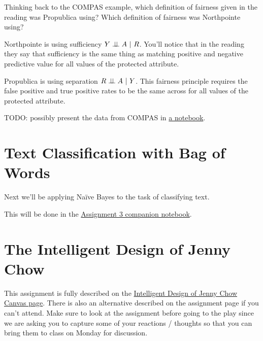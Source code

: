 \documentclass[assignment03_Solutions]{subfiles}
\begin{document}
\begin{exercise}[(5 minutes)]
Thinking back to the COMPAS example, which definition of fairness given in the reading was Propublica using?  Which definition of fairness was Northpointe using?

\begin{boxedsolution}
\bi
\item Northpointe is using sufficiency $Y \perp\!\!\!\perp A~|~R$.  You'll notice that in the reading they say that sufficiency is the same thing as matching positive and negative predictive value for all values of the protected attribute.
\item Propublica is using separation $R \perp\!\!\!\perp A~|~Y$.  This fairness principle requires the false positive and true positive rates to be the same across for all values of the protected attribute.
\ei
\end{boxedsolution}
\end{exercise}

TODO: possibly present the data from COMPAS in \href{https://colab.research.google.com/drive/1HMX0GJAF0PcCn6INfCoeqNOASJri_V_s}{a notebook}.


\section{Text Classification with Bag of Words}
Next we'll be applying Na\"ive Bayes to the task of classifying text.

\begin{externalresources}[(45 minutes)]
This will be done in the \href{https://colab.research.google.com/github/mlfa19/assignments/blob/master/Module\%202/03/Assignment_3_Companion_Notebook.ipynb}{Assignment 3 companion notebook}.
\end{externalresources}

\section{The Intelligent Design of Jenny Chow}

This assignment is fully described on the \href{https://canvas.instructure.com/courses/1659968/assignments/12785465?module_item_id=26196347}{Intelligent Design of Jenny Chow Canvas page}.  There is also an alternative described on the assignment page if you can't attend.  Make sure to look at the assignment before going to the play since we are asking you to capture some of your reactions / thoughts so that you can bring them to class on Monday for discussion.
\end{document}
